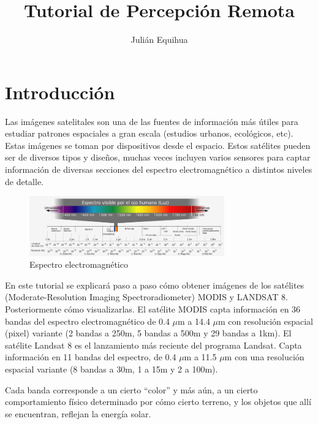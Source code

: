 \documentclass[11pt,spanish]{article}
\title{Tutorial de Percepción Remota}
\author{Julián Equihua}
\begin{document}
\section{Introducción}

Las imágenes satelitales son una de las fuentes de información más útiles para estudiar patrones espaciales a gran escala (estudios urbanos, ecológicos, etc). Estas imágenes se toman por dispositivos desde el espacio. Estos satélites pueden ser de diversos tipos y diseños, muchas veces incluyen varios sensores para captar información de diversas secciones del espectro electromagnético a distintos niveles de detalle.

\begin{figure}[h!]
  \centering
  \includegraphics[width=0.75\textwidth]{1_espectro.png}
  \caption{Espectro electromagnético}
\end{figure}
 
En este tutorial se explicará paso a paso cómo obtener imágenes de los satélites (Moderate-Resolution Imaging Spectroradiometer) MODIS y LANDSAT 8. Posteriormente cómo visualizarlas. El satélite MODIS capta información en 36 bandas del espectro electromagnético de 0.4 $\mu$m a 14.4 $\mu$m con resolución espacial (pixel) variante (2 bandas a 250m, 5 bandas a 500m y 29 bandas a 1km). El satélite Landsat 8 es el lanzamiento más reciente del programa Landsat. Capta información en 11 bandas del espectro, de 0.4 $\mu$m a 11.5 $\mu$m con una resolución espacial variante (8 bandas a 30m, 1 a 15m y 2 a 100m).

\newpage

Cada banda corresponde a un cierto "`color"' y más aún, a un cierto comportamiento físico determinado por cómo cierto terreno, y los objetos que allí se encuentran, reflejan la energía solar.
\end{document}
